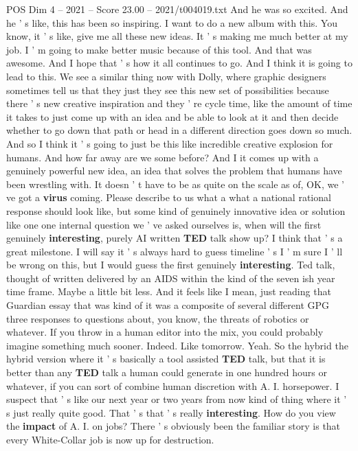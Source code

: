 \begin{textsample}{POS Dim 4 – 2021 – Score 23.00 – 2021/t004019.txt}
And he was so excited.
And he ' s like, this has been so inspiring.
I want to do a new album with this.
You know, it ' s like, give me all these new ideas.
It ' s making me much better at my job.
I ' m going to make better music because of this tool.
And that was awesome.
And I hope that ' s how it all continues to go.
And I think it is going to lead to this.
We see a similar thing now with Dolly, where graphic designers sometimes tell us that they just they see this new set of possibilities because there ' s new creative inspiration and they ' re cycle time, like the amount of time it takes to just come up with an idea and be able to look at it and then decide whether to go down that path or head in a different direction goes down so much.
And so I think it ' s going to just be this like incredible creative explosion for humans.
And how far away are we some before?
And I it comes up with a genuinely powerful new idea, an idea that solves the problem that humans have been wrestling with.
It doesn ' t have to be as quite on the scale as of, OK, we ' ve got a \textbf{virus} coming.
Please describe to us what a what a national rational response should look like, but some kind of genuinely innovative idea or solution like one one internal question we ' ve asked ourselves is, when will the first genuinely \textbf{interesting}, purely AI written \textbf{TED} talk show up?
I think that ' s a great milestone.
I will say it ' s always hard to guess timeline ' s I ' m sure I ' ll be wrong on this, but I would guess the first genuinely \textbf{interesting}.
Ted talk, thought of written delivered by an AIDS within the kind of the seven ish year time frame.
Maybe a little bit less.
And it feels like I mean, just reading that Guardian essay that was kind of it was a composite of several different GPG three responses to questions about, you know, the threats of robotics or whatever.
If you throw in a human editor into the mix, you could probably imagine something much sooner.
Indeed.
Like tomorrow.
Yeah.
So the hybrid the hybrid version where it ' s basically a tool assisted \textbf{TED} talk, but that it is better than any \textbf{TED} talk a human could generate in one hundred hours or whatever, if you can sort of combine human discretion with A.
I. horsepower.
I suspect that ' s like our next year or two years from now kind of thing where it ' s just really quite good.
That ' s that ' s really \textbf{interesting}.
How do you view the \textbf{impact} of A.
I. on jobs?
There ' s obviously been the familiar story is that every White-Collar job is now up for destruction.

\end{textsample}
